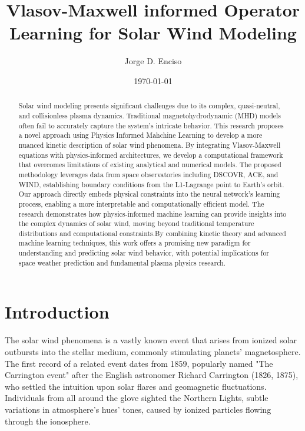 \documentclass[12pt]{article}
\title{Vlasov-Maxwell informed Operator Learning for Solar Wind Modeling}
\author{Jorge D. Enciso}
\date{\today}
\begin{document}
\maketitle

\begin{abstract}
    Solar wind modeling presents significant challenges due to its complex, quasi-neutral, and collisionless plasma dynamics. Traditional magnetohydrodynamic (MHD) models often fail to accurately capture the system's intricate behavior. This research proposes a novel approach using Physics Informed Mahchine Learning to develop a more nuanced kinetic description of solar wind phenomena. By integrating Vlasov-Maxwell equations with physics-informed architectures, we develop a computational framework that overcomes limitations of existing analytical and numerical models. The proposed methodology leverages data from space observatories including DSCOVR, ACE, and WIND, establishing boundary conditions from the L1-Lagrange point to Earth's orbit. Our approach directly embeds physical constraints into the neural network's learning process, enabling a more interpretable and computationally efficient model. The research demonstrates how physics-informed machine learning can provide insights into the complex dynamics of solar wind, moving beyond traditional temperature distributions and computational constraints.By combining kinetic theory and advanced machine learning techniques, this work offers a promising new paradigm for understanding and predicting solar wind behavior, with potential implications for space weather prediction and fundamental plasma physics research.
\end{abstract}

\tableofcontents
\newpage

\section{Introduction}

The solar wind phenomena is a vastly known event that arises from ionized solar outbursts into the stellar medium, commonly stimulating planets' magnetosphere. \cite{Gosling2007} The first record of a related event dates from 1859, popularly named "The Carrington event" after the English astronomer Richard Carrington (1826, 1875), who settled the intuition upon solar flares and geomagnetic fluctuations. Individuals from all around the glove sighted the Northern Lights, subtle variations in atmosphere's hues' tones, caused by ionized particles flowing through the ionosphere.
\end{document}
